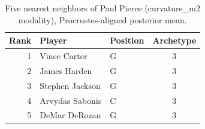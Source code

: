 \begin{table}[htbp]
  \centering\small
  \begin{tabular}{rllc}
    \toprule
    Rank & Player & Position & Archetype \\
    \midrule
    1 & Vince Carter & G & 3 \\
    2 & James Harden & G & 3 \\
    3 & Stephen Jackson & G & 3 \\
    4 & Arvydas Sabonis & C & 3 \\
    5 & DeMar DeRozan & G & 3 \\
    \bottomrule
  \end{tabular}
  \caption{Five nearest neighbors of Paul Pierce (curvature_m2 modality), Procrustes-aligned posterior mean.}
  \label{tab:Paul_Pierce_neighbors_curvature_m2}
\end{table}

